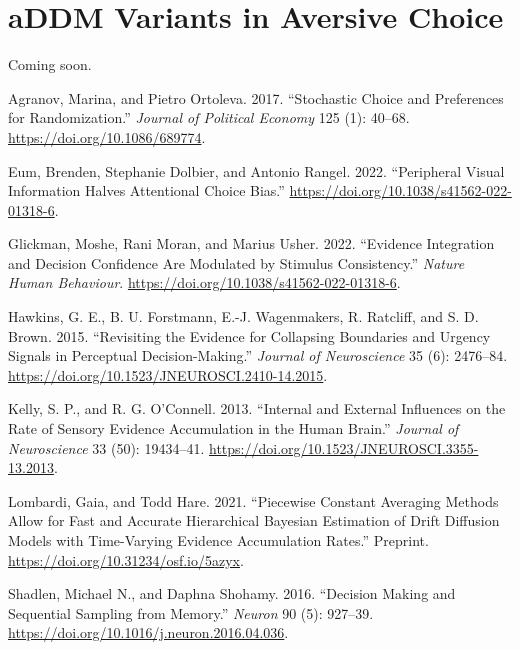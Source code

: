 \documentclass[
]{book}
\newlength{\cslhangindent}
\newlength{\cslentryspacingunit} %
\newenvironment{CSLReferences}[2] %
 {%
  \setlength{\parindent}{0pt}
  \ifodd #1
  \let\oldpar\par
  \def\par{\hangindent=\cslhangindent\oldpar}
  \fi
  \setlength{\parskip}{#2\cslentryspacingunit}
 }%
 {}
\begin{document}
\hypertarget{addmvariants}{%
\chapter{aDDM Variants in Aversive Choice}\label{addmvariants}}

Coming soon.

\hypertarget{refs}{}
\begin{CSLReferences}{1}{0}
\leavevmode{}%
Agranov, Marina, and Pietro Ortoleva. 2017. {``Stochastic Choice and Preferences for Randomization.''} \emph{Journal of Political Economy} 125 (1): 40--68. \url{https://doi.org/10.1086/689774}.

\leavevmode{}%
Eum, Brenden, Stephanie Dolbier, and Antonio Rangel. 2022. {``Peripheral Visual Information Halves Attentional Choice Bias.''} \url{https://doi.org/10.1038/s41562-022-01318-6}.

\leavevmode{}%
Glickman, Moshe, Rani Moran, and Marius Usher. 2022. {``Evidence Integration and Decision Confidence Are Modulated by Stimulus Consistency.''} \emph{Nature Human Behaviour}. \url{https://doi.org/10.1038/s41562-022-01318-6}.

\leavevmode{}%
Hawkins, G. E., B. U. Forstmann, E.-J. Wagenmakers, R. Ratcliff, and S. D. Brown. 2015. {``Revisiting the Evidence for Collapsing Boundaries and Urgency Signals in Perceptual Decision-Making.''} \emph{Journal of Neuroscience} 35 (6): 2476--84. \url{https://doi.org/10.1523/JNEUROSCI.2410-14.2015}.

\leavevmode{}%
Kelly, S. P., and R. G. O'Connell. 2013. {``Internal and {External Influences} on the {Rate} of {Sensory Evidence Accumulation} in the {Human Brain}.''} \emph{Journal of Neuroscience} 33 (50): 19434--41. \url{https://doi.org/10.1523/JNEUROSCI.3355-13.2013}.

\leavevmode{}%
Lombardi, Gaia, and Todd Hare. 2021. {``Piecewise Constant Averaging Methods Allow for Fast and Accurate Hierarchical {Bayesian} Estimation of Drift Diffusion Models with Time-Varying Evidence Accumulation Rates.''} Preprint. \url{https://doi.org/10.31234/osf.io/5azyx}.

\leavevmode{}%
Shadlen, Michael N., and Daphna Shohamy. 2016. {``Decision {Making} and {Sequential Sampling} from {Memory}.''} \emph{Neuron} 90 (5): 927--39. \url{https://doi.org/10.1016/j.neuron.2016.04.036}.


\end{CSLReferences}
\end{document}
